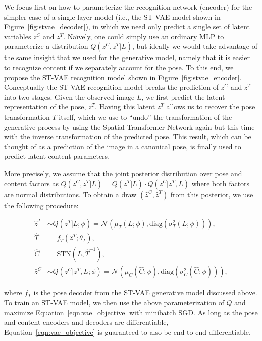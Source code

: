We focus first on how to parameterize the recognition network (encoder) for the simpler case of a single layer model (i.e., the ST-VAE model
shown in Figure~\ref{fig:stvae_decoder}), in which we need only predict a single set of latent variables $z^C$ and $z^T$.
Na\"{i}vely, one could 
simply use an ordinary MLP to parameterize a distribution $Q(z^C, z^T | L)$, but ideally we would take advantage of the same
 insight that we used for the generative model,
namely 
 that it is easier to recognize content if we separately account for the
 pose.
To this end, we propose the ST-VAE recognition model shown in Figure~\ref{fig:stvae_encoder}. 
Conceptually the ST-VAE recognition model breaks the prediction of $z^C$ and $z^T$ into two stages.  Given the observed image $L$,
we first predict the latent representation of the pose, $z^T$.  Having this latent $z^T$ allows us to recover the pose transformation 
$T$ itself, which we use to ``undo'' the transformation of the generative process
by using the Spatial Transformer Network again but this time with the inverse transformation of the predicted pose.  This result, which can be
thought of as a prediction of the image in a canonical pose, is finally used to predict latent content parameters.


More precisely, we assume that the joint posterior distribution over
pose and content factors as
$Q(z^C, z^T | L) = Q(z^T |L)\cdot Q(z^C | z^T, L)$ where both factors are normal distributions.  
To obtain a draw $(\hat{z}^C, \hat{z}^T)$ from this posterior, we use the following procedure:\vspace{-4mm}

{\footnotesize
\begin{align*}
\hat{z}^T &\sim Q(z^T |L; \phi) = \mathcal{N}(\mu_{T}(L; \phi), \mbox{diag}(\sigma_{T}^2(L; \phi))), \\
\hat{T} &= f_T(\hat{z}^T; \theta_T), \\
\hat{C} &= \mbox{STN}(L, \hat{T}^{-1}), \\
\hat{z}^C &\sim Q(z^C | z^T, L; \phi) =  \mathcal{N}(\mu_{C}(\hat{C}; \phi), \mbox{diag}(\sigma_{C}^2(\hat{C}; \phi))),
\end{align*}\vspace{-4mm}
}

where $f_T$ is the pose decoder from the ST-VAE generative model discussed above.
To train an ST-VAE model, we then use the above parameterization of $Q$ and maximize Equation~\ref{eqn:vae_objective} with minibatch
SGD.
As long as the pose and content encoders and decoders  are differentiable, Equation~\ref{eqn:vae_objective} is guaranteed to also be 
end-to-end differentiable.

